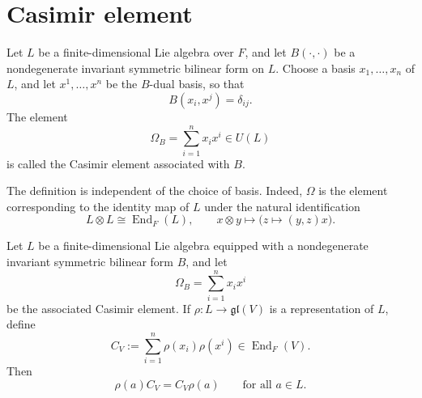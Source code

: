 \section{Casimir element}

\begin{definition}
    Let $L$ be a finite-dimensional Lie algebra over $F$, and let
    $B(\cdot,\cdot)$ be a nondegenerate invariant symmetric bilinear form on $L$.
    Choose a basis $x_1,\dots,x_n$ of $L$, and let $x^1,\dots,x^n$ be the
    $B$-dual basis, so that
    \[
        B(x_i,x^j)=\delta_{ij}.
    \]
    The element
    \[
        \Omega_B=\sum_{i=1}^n x_i x^i \in U(L)
    \]
    is called the Casimir element associated with $B$.
\end{definition}

\begin{remark}
    The definition is independent of the choice of basis. Indeed, $\Omega$ is the element corresponding to the identity map of $L$ under the natural identification
    \[
        L \otimes L \cong \operatorname{End}_F(L),\qquad
        x \otimes y \mapsto \bigl(z \mapsto (y,z)x\bigr).
    \]
\end{remark}

\begin{proposition}
    Let $L$ be a finite-dimensional Lie algebra equipped with a nondegenerate invariant symmetric bilinear form $B$, and let
    \[
        \Omega_B=\sum_{i=1}^n x_i x^i
    \]
    be the associated Casimir element. If $\rho:L\to\mathfrak{gl}(V)$ is a representation of $L$, define
    \[
        C_V:=\sum_{i=1}^n \rho(x_i)\rho(x^i)\in \operatorname{End}_F(V).
    \]
    Then
    \[
        \rho(a)C_V=C_V\rho(a)
        \qquad\text{for all } a\in L.
    \]
\end{proposition}

